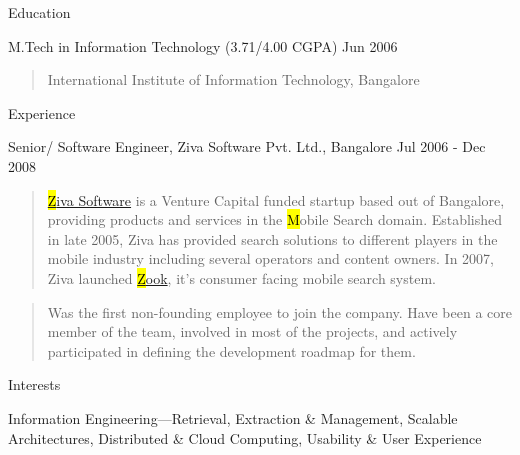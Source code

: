 \documentclass{resume}
\author{Siddhartha Reddy Kothakapu}
\begin{document}
 \maketitle

\begin{category}{Education}{}

    \item {\topic M.Tech in Information Technology}
        {\footnotesize(3.71/4.00 CGPA)}
        {\period Jun 2006}
        \begin{quote}
            International Institute of Information Technology, Bangalore
        \end{quote}

\end{category}


\begin{category}{Experience}{}

    \item {\topic Senior/ Software Engineer,} Ziva Software Pvt. Ltd., Bangalore
        {\period Jul 2006 - Dec 2008}
        \begin{quote}
            \href{http://www.zook.in/}{{\hl Ziva Software}} is a Venture
            Capital funded startup based out of Bangalore, providing products
            and services in the {\hl Mobile Search} domain.  Established in
            late 2005, Ziva has provided search solutions to different players
            in the mobile industry including several operators and content
            owners. In 2007, Ziva launched \href{http://www.zook.in/}{{\hl
            Zook}}, it's consumer facing mobile search system.
        \end{quote}
        \begin{quote}
            Was the first non-founding employee to join the company. Have been
            a core member of the team, involved in most of the projects, and    %
            actively participated in defining the development roadmap for them.
        \end{quote}

\end{category}


\begin{category}{Interests}{}

    \item Information Engineering---Retrieval, Extraction \&
    Management, Scalable Architectures, Distributed \& Cloud Computing,
    Usability \& User Experience

\end{category}
\end{document}
